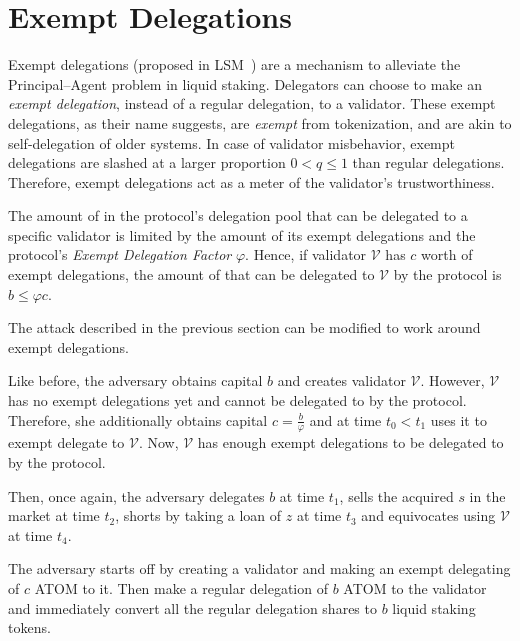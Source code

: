 \section{Exempt Delegations}

Exempt delegations (proposed in LSM~\cite{liquidity-staking-module})
are a mechanism to alleviate
the Principal--Agent problem in liquid staking.
Delegators can choose to make an \emph{exempt delegation},
instead of a regular delegation, to a validator.
These exempt delegations, as their name suggests,
are \emph{exempt} from tokenization,
and are akin to self-delegation of older systems.
In case of validator misbehavior, exempt delegations
are slashed at a larger proportion $0 < q \leq 1$ than regular delegations.
Therefore, exempt delegations act as a meter of the
validator's trustworthiness.


The amount of \asset in the protocol's delegation pool that can be
delegated to a specific validator is limited by the amount of its
exempt delegations and the protocol's \emph{Exempt Delegation Factor} $\varphi$.
Hence, if validator $\mathcal{V}$ has $c$ \asset worth of exempt delegations,
the amount of \asset that can be delegated to $\mathcal{V}$ by the protocol
is $b \leq \varphi c$.

The attack described in the previous section can be modified to work
around exempt delegations.

Like before, the adversary obtains capital $b$ \asset and creates
validator $\mathcal{V}$.
However, $\mathcal{V}$ has no exempt delegations yet and cannot be delegated to
by the protocol.
Therefore, she additionally obtains capital $c = \frac{b}{\varphi}$ \asset
and at time $t_0 < t_1$ uses it to exempt delegate to $\mathcal{V}$.
Now, $\mathcal{V}$ has enough exempt delegations to be delegated to by the protocol.

Then, once again, the adversary delegates $b$ \asset at time $t_1$,
sells the acquired $s$ \stasset in the market at time $t_2$, shorts \stasset by taking a loan
of $z$ \stasset at time $t_3$ and equivocates using $\mathcal{V}$ at time $t_4$.


The adversary starts off by creating a validator and making an
exempt delegating of $c$ ATOM to it.
Then make a regular delegation of $b$ ATOM to the validator and
immediately convert all the regular delegation shares to $b$ liquid
staking tokens.

